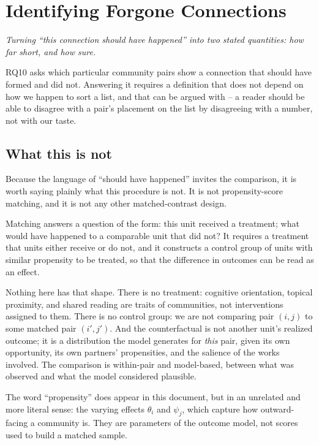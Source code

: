 \documentclass[11pt]{article}
\newcommand{\seccap}[1]{{\slshape\small #1\par}\vspace{0.8em}}
\begin{document}
\section{Identifying Forgone Connections}
\label{sec:forgone}
\seccap{Turning ``this connection should have happened'' into two stated quantities: how far
short, and how sure.}

RQ10 asks which particular community pairs show a connection that should have formed and did
not. Answering it requires a definition that does not depend on how we happen to sort a list,
and that can be argued with -- a reader should be able to disagree with a pair's placement on
the list by disagreeing with a number, not with our taste.

\subsection{What this is not}

Because the language of ``should have happened'' invites the comparison, it is worth saying
plainly what this procedure is not. It is not propensity-score matching, and it is not any
other matched-contrast design.

Matching answers a question of the form: this unit received a treatment; what would have
happened to a comparable unit that did not? It requires a treatment that units either receive
or do not, and it constructs a control group of units with similar propensity to be treated,
so that the difference in outcomes can be read as an effect.

Nothing here has that shape. There is no treatment: cognitive orientation, topical proximity,
and shared reading are traits of communities, not interventions assigned to them. There is no
control group: we are not comparing pair $(i,j)$ to some matched pair $(i',j')$. And the
counterfactual is not another unit's realized outcome; it is a distribution the model
generates for \emph{this} pair, given its own opportunity, its own partners' propensities,
and the salience of the works involved. The comparison is within-pair and model-based,
between what was observed and what the model considered plausible.

The word ``propensity'' does appear in this document, but in an unrelated and more literal
sense: the varying effects $\theta_i$ and $\psi_j$, which capture how outward-facing a
community is. They are parameters of the outcome model, not scores used to build a matched
sample.
\end{document}
